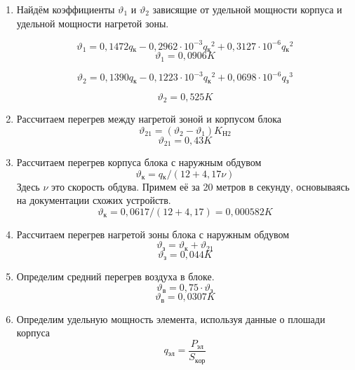 \begin{enumerate}[label={\arabic*.}]
\item Найдём коэффициенты
$\vartheta_1$ и $\vartheta_2$ зависящие
от удельной мощности корпуса и удельной мощности нагретой зоны.

\begin{equation}
\vartheta_1 = 0,1472q\mathrm{_к} - 0,2962 \cdot 10^{-3}q\mathrm{_к}^2 + 0,3127 \cdot 10^{-6}q\mathrm{_к}^2
\end{equation}
$$\vartheta_1=0,0906K$$

\begin{equation}
\vartheta_2 = 0,1390q\mathrm{_к} - 0,1223 \cdot 10^{-3}q\mathrm{_к}^2 + 0,0698 \cdot 10^{-6}q\mathrm{_з}^3
\end{equation}

$$\vartheta_2 = 0,525K$$

\item Рассчитаем перегрев между нагретой зоной и корпусом блока
  \begin{equation}
    \vartheta_{21} = (\vartheta_2-\vartheta_1)K\mathrm{_{Н2}}
  \end{equation}
  $$\vartheta_{21}=0,43K$$

\item Рассчитаем перегрев корпуса блока с наружным обдувом
  \begin{equation}
    \vartheta\mathrm{_к} = q\mathrm{_к}/(12+4,17\nu)
  \end{equation}
  Здесь $\nu$ это скорость обдува. Примем её за 20 метров в секунду,
  основываясь на документации схожих устройств.
  $$\vartheta\mathrm{_к} = 0,0617/(12+4,17) = 0,000582K$$

\item Рассчитаем перегрев нагретой зоны блока с наружным обдувом
  \begin{equation}
    \vartheta\mathrm{_з} = \vartheta\mathrm{_к} + \vartheta_{21}
  \end{equation}
  $$\vartheta\mathrm{_з} = 0,044K$$
    \item Определим средний перегрев воздуха в блоке.
    \begin{equation}
      \vartheta\mathrm{_в} = 0,75 \cdot \vartheta\mathrm{_з}
    \end{equation}
    $$\vartheta\mathrm{_в} = 0,0307K$$

\item Определим удельную мощность элемента, используя данные о плошади
корпуса
    \begin{equation}
      q\mathrm{_{эл}} = \frac{P\mathrm{_{эл}}}{S\mathrm{_{кор}}}
    \end{equation}


\end{enumerate}
